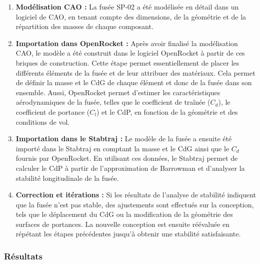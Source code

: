 \hspace*{-\parindent}%
\begin{minipage}{0.75\textwidth}
    \begin{enumerate}
        \item \textbf{Modélisation \acrshort{CAO} :} La fusée SP-02 a été modélisée en détail dans un logiciel de \acrshort{CAO}, en
        tenant compte des dimensions, de la géométrie et de la répartition des masses de chaque composant.\\
        
        \item \textbf{Importation dans \gls{OpenRocket} :} Après avoir finalisé la modélisation \acrshort{CAO}, le modèle a été
        construit dans le logiciel \gls{OpenRocket} à partir de ces briques de construction. Cette étape permet essentiellement de
        placer les différents éléments de la fusée et de leur attribuer des matériaux. Cela permet de définir la masse et le
        \acrfull{CdG} de chaque élément et donc de la fusée dans son ensemble. Aussi, \gls{OpenRocket} permet d'estimer les
        caractéristiques aérodynamiques de la fusée, telles que le coefficient de traînée ($C_d$), le coefficient de portance ($C_l$)
        et le \acrfull{CdP}, en fonction de la géométrie et des conditions de vol.\\

        \item \textbf{Importation dans le \gls{Stabtraj} :} Le modèle de la fusée a ensuite été importé dans le \gls{Stabtraj} en comptant
        la masse et le \acrshort{CdG} ainsi que le $C_d$ fournis par \gls{OpenRocket}. En utilisant ces données, le \gls{Stabtraj}
        permet de calculer le \acrshort{CdP} à partir de l'approximation de Barrowman \cite{Stab_doc} et d'analyser la stabilité
        longitudinale de la fusée.\\

        \item \textbf{Correction et itérations :} Si les résultats de l'analyse de stabilité indiquent que la fusée n'est pas stable,
        des ajustements sont effectués sur la conception, tels que le déplacement du \acrshort{CdG} ou la modification de la géométrie
        des surfaces de portances. La nouvelle conception est ensuite réévaluée en répétant les étapes précédentes jusqu'à obtenir
        une stabilité satisfaisante.\\
    \end{enumerate}

    \subsubsection{Résultats}
    \label{subsubsec:stabilite_resultats}


\end{minipage}
